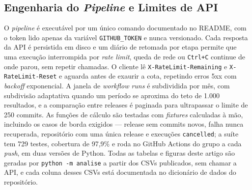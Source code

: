 \subsection{Engenharia do \emph{Pipeline} e Limites de API}

O \emph{pipeline} é executável por um único comando documentado no README, com o token lido
apenas da variável \texttt{GITHUB\_TOKEN} e nunca versionado. Cada resposta da API é
persistida em disco e um diário de retomada por etapa permite que uma execução interrompida
por \emph{rate limit}, queda de rede ou \texttt{Ctrl+C} continue de onde parou, sem repetir
chamadas. O cliente lê \texttt{X-RateLimit-Remaining} e \texttt{X-RateLimit-Reset} e aguarda
antes de exaurir a cota, repetindo erros 5xx com \emph{backoff} exponencial. A janela de
\emph{workflow runs} é subdividida por mês, com subdivisão adaptativa quando um período se
aproxima do teto de 1.000 resultados, e a comparação entre releases é paginada para
ultrapassar o limite de 250 commits. As funções de cálculo são testadas com \emph{fixtures}
calculadas à mão, incluindo os casos de borda exigidos --- release sem commits novos, falha
nunca recuperada, repositório com uma única release e execuções \texttt{cancelled}; a suíte
tem 729 testes, cobertura de 97,9\% e roda no GitHub Actions do grupo a cada \emph{push}, em
duas versões de Python. Todas as tabelas e figuras deste artigo são geradas por
\texttt{python -m analise} a partir dos CSVs publicados, sem chamar a API, e cada coluna
desses CSVs está documentada no dicionário de dados do repositório.
